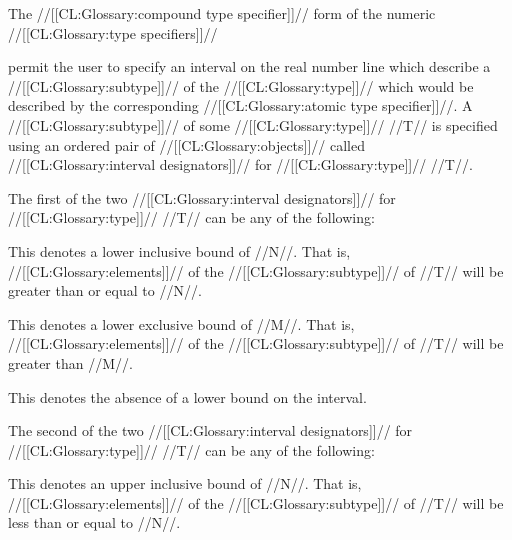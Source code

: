 \endsubsubsection%

\endsubsection%


The //[[CL:Glossary:compound type specifier]]// form of the numeric //[[CL:Glossary:type specifiers]]//



permit the user to specify an interval on the real number line
which describe a //[[CL:Glossary:subtype]]// of the //[[CL:Glossary:type]]// which would be described by the
corresponding //[[CL:Glossary:atomic type specifier]]//.  A //[[CL:Glossary:subtype]]// of some //[[CL:Glossary:type]]//
//T// is specified using an ordered pair of //[[CL:Glossary:objects]]// called
//[[CL:Glossary:interval designators]]// for //[[CL:Glossary:type]]// //T//.

The first of the two //[[CL:Glossary:interval designators]]// for //[[CL:Glossary:type]]// //T// can be
any of the following:

\beginlist


This denotes a lower inclusive bound of //N//.  That is, //[[CL:Glossary:elements]]//
of the //[[CL:Glossary:subtype]]// of //T// will be greater than or equal to //N//.


This denotes a lower exclusive bound of //M//.  That is, //[[CL:Glossary:elements]]//
of the //[[CL:Glossary:subtype]]// of //T// will be greater than //M//.


This denotes the absence of a lower bound on the interval.

\endlist

The second of the two //[[CL:Glossary:interval designators]]// for //[[CL:Glossary:type]]// //T// can be
any of the following:

\beginlist


This denotes an upper inclusive bound of //N//.  That is, //[[CL:Glossary:elements]]//
of the //[[CL:Glossary:subtype]]// of //T// will be less than or equal to //N//.

